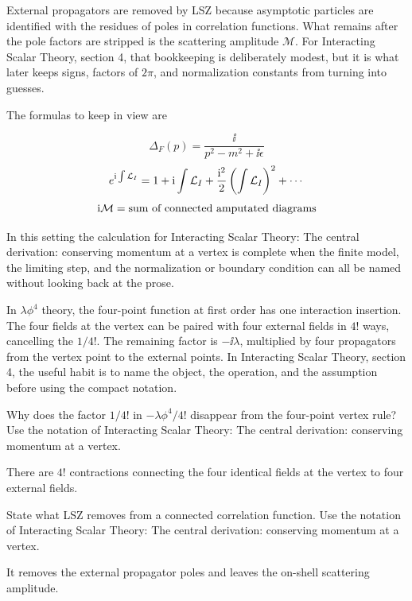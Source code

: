 External propagators are removed by LSZ because asymptotic particles are identified with the residues of poles in correlation functions.  What remains after the pole factors are stripped is the scattering amplitude \(\mathcal M\).  For Interacting Scalar Theory, section 4, that bookkeeping is deliberately modest, but it is what later keeps signs, factors of \(2\pi\), and normalization constants from turning into guesses.

The formulas to keep in view are

\[
  \Delta_F(p)=\frac{\ii}{p^2-m^2+\ii\epsilon}
\]
\[
  e^{\mathrm i\int\mathcal L_I}=1+\mathrm i\int\mathcal L_I+\frac{\mathrm i^2}{2}\left(\int\mathcal L_I\right)^2+\cdots
\]
\[
  \mathrm i\mathcal M=\hbox{sum of connected amputated diagrams}
\]

In this setting the calculation for Interacting Scalar Theory: The central derivation: conserving momentum at a vertex is complete when the finite model, the limiting step, and the normalization or boundary condition can all be named without looking back at the prose.




\begin{example}
In \(\lambda\phi^4\) theory, the four-point function at first order has one interaction insertion.  The four fields at the vertex can be paired with four external fields in \(4!\) ways, cancelling the \(1/4!\).  The remaining factor is \(-\ii\lambda\), multiplied by four propagators from the vertex point to the external points.  In Interacting Scalar Theory, section 4, the useful habit is to name the object, the operation, and the assumption before using the compact notation.
\end{example}



\begin{exercise}
Why does the factor \(1/4!\) in \(-\lambda\phi^4/4!\) disappear from the four-point vertex rule?  Use the notation of Interacting Scalar Theory: The central derivation: conserving momentum at a vertex.
\begin{answer}
There are \(4!\) contractions connecting the four identical fields at the vertex to four external fields.
\end{answer}
\end{exercise}

\begin{exercise}
State what LSZ removes from a connected correlation function.  Use the notation of Interacting Scalar Theory: The central derivation: conserving momentum at a vertex.
\begin{answer}
It removes the external propagator poles and leaves the on-shell scattering amplitude.
\end{answer}
\end{exercise}



